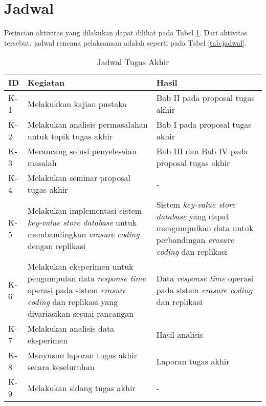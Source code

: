 \section{Jadwal}
\label{sec:jadwal}
Perincian aktivitas yang dilakukan dapat dilihat pada  Tabel \ref{tab:rincian-aktivitas}. Dari aktivitas tersebut, jadwal rencana pelaksanaan adalah seperti pada Tabel \ref{tab:jadwal}.

\begin{table}[h!]
\centering
\caption{Jadwal Tugas Akhir}
\begin{tabular}{|p{1cm}|p{6cm}|p{6cm}|}
\hline
ID & Kegiatan & Hasil \\ \hline
K-1  & Melakukkan kajian pustaka & Bab II pada proposal tugas akhir \\ \hline
K-2  & Melakukan analisis permasalahan untuk topik tugas akhir & Bab I pada proposal tugas akhir \\ \hline
K-3  & Merancang solusi penyelesaian masalah & Bab III dan Bab IV pada proposal tugas akhir \\ \hline
K-4  & Melakukan seminar proposal tugas akhir & - \\ \hline
K-5  & Melakukan implementasi sistem \textit{key-value store database} untuk membandingkan \textit{erasure coding} dengan replikasi \textit{} & Sistem \textit{key-value store database} yang dapat mengumpulkan data untuk perbandingan \textit{erasure coding} dan replikasi \\ \hline
K-6  & Melakukan eksperimen untuk pengumpulan data \textit{response time} operasi pada sistem \textit{erasure coding} dan replikasi yang divariasikan sesuai rancangan & Data \textit{response time} operasi pada sistem \textit{erasure coding} dan replikasi \\ \hline
K-7  & Melakukan analisis data eksperimen & Hasil analisis \\ \hline
K-8  & Menyusun laporan tugas akhir secara keseluruhan & Laporan tugas akhir \\ \hline
K-9  & Melakukan sidang tugas akhir & - \\ \hline
\end{tabular}
\label{tab:rincian-aktivitas}
\end{table}

